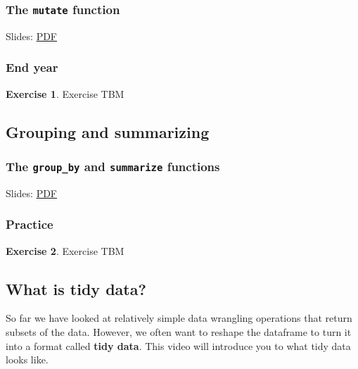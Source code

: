 \documentclass[
]{article}
\theoremstyle{definition}
\theoremstyle{definition}
\theoremstyle{definition}
\newtheorem{exercise}{Exercise}[section]
\theoremstyle{definition}
\theoremstyle{remark}
\begin{document}
\hypertarget{the-mutate-function}{%
\subsubsection{\texorpdfstring{The \texttt{mutate} function}{The mutate function}}\label{the-mutate-function}}

Slides: \href{https://drive.google.com/file/d/155Z3Zs3AUjg6We5IotAexY_bdpFGDDvA}{PDF}

\hypertarget{end-year}{%
\subsubsection{End year}\label{end-year}}

\begin{exercise}
Exercise TBM
\end{exercise}

\hypertarget{grouping-and-summarizing}{%
\subsection{Grouping and summarizing}\label{grouping-and-summarizing}}

\hypertarget{the-group_by-and-summarize-functions}{%
\subsubsection{\texorpdfstring{The \texttt{group\_by} and \texttt{summarize} functions}{The group\_by and summarize functions}}\label{the-group_by-and-summarize-functions}}

Slides: \href{https://drive.google.com/file/d/1myTkhZPrLjylP5mtvkARZrk7GFhxzR5H}{PDF}

\hypertarget{practice}{%
\subsubsection{Practice}\label{practice}}

\begin{exercise}
Exercise TBM
\end{exercise}

\hypertarget{what-is-tidy-data}{%
\subsection{What is tidy data?}\label{what-is-tidy-data}}

So far we have looked at relatively simple data wrangling operations that return subsets of the data. However, we often want to reshape the dataframe to turn it into a format called \textbf{tidy data}. This video will introduce you to what tidy data looks like.
\end{document}

